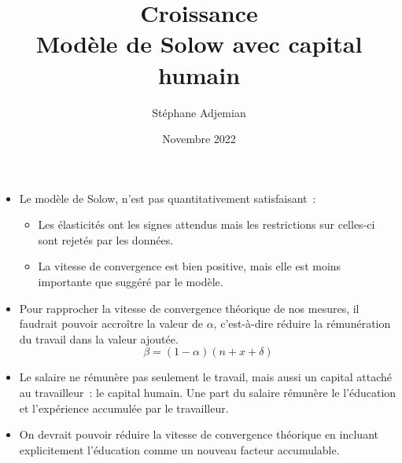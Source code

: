 \documentclass[10pt,notheorems]{beamer}
\theoremstyle{plain}
\theoremstyle{definition} %
\begin{document}
\title{Croissance\\\small{Modèle de Solow avec capital humain}}
\author[S. Adjemian]{Stéphane Adjemian}
\date{Novembre 2022}

\begin{frame}
  \titlepage{}
\end{frame}


\begin{frame}

  \begin{itemize}

  \item Le modèle de Solow, n'est pas quantitativement satisfaisant~:
    \medskip
    \begin{itemize}
    \item Les élasticités ont les signes attendus mais les restrictions sur celles-ci sont rejetés par les données.
    \item La vitesse de convergence est bien positive, mais elle est moins importante que suggéré par le modèle.\newline
    \end{itemize}

  \item Pour rapprocher la vitesse de convergence théorique de nos mesures, il
    faudrait pouvoir accroître la valeur de $\alpha$, c'est-à-dire réduire la
    rémunération du travail dans la valeur ajoutée.\newline
    \[
      \beta = (1-\alpha)(n+x+\delta)
    \]

  \item Le salaire ne rémunère pas seulement le travail, mais aussi un capital
    attaché au travailleur~: le capital humain. Une part du salaire rémunère le
    l'éducation et l'expérience accumulée par le travailleur.\newline

  \item On devrait pouvoir réduire la vitesse de convergence théorique en
    incluant explicitement l'éducation comme un nouveau facteur accumulable.

  \end{itemize}

\end{frame}
\end{document}
